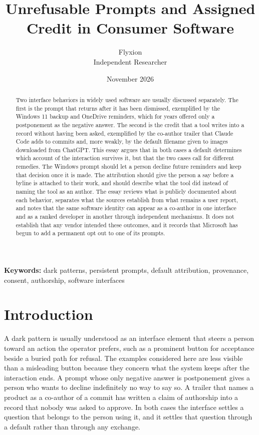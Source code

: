 \documentclass[11pt]{article}
\title{Unrefusable Prompts and Assigned Credit in Consumer Software}
\author{Flyxion\\Independent Researcher}
\date{November 2026}
\begin{document}
\maketitle

\begin{abstract}
\noindent Two interface behaviors in widely used software are usually discussed separately. The first is the prompt that returns after it has been dismissed, exemplified by the Windows 11 backup and OneDrive reminders, which for years offered only a postponement as the negative answer. The second is the credit that a tool writes into a record without having been asked, exemplified by the co-author trailer that Claude Code adds to commits and, more weakly, by the default filename given to images downloaded from ChatGPT. This essay argues that in both cases a default determines which account of the interaction survives it, but that the two cases call for different remedies. The Windows prompt should let a person decline future reminders and keep that decision once it is made. The attribution should give the person a say before a byline is attached to their work, and should describe what the tool did instead of naming the tool as an author. The essay reviews what is publicly documented about each behavior, separates what the sources establish from what remains a user report, and notes that the same software identity can appear as a co-author in one interface and as a ranked developer in another through independent mechanisms. It does not establish that any vendor intended these outcomes, and it records that Microsoft has begun to add a permanent opt out to one of its prompts.
\end{abstract}

\vspace{2.5em}
\noindent\textbf{Keywords:} dark patterns, persistent prompts, default attribution, provenance, consent, authorship, software interfaces

\newpage

\section{Introduction}

A dark pattern is usually understood as an interface element that steers a person toward an action the operator prefers, such as a prominent button for acceptance beside a buried path for refusal. The examples considered here are less visible than a misleading button because they concern what the system keeps after the interaction ends. A prompt whose only negative answer is postponement gives a person who wants to decline indefinitely no way to say so. A trailer that names a product as a co-author of a commit has written a claim of authorship into a record that nobody was asked to approve. In both cases the interface settles a question that belongs to the person using it, and it settles that question through a default rather than through any exchange.
\end{document}
